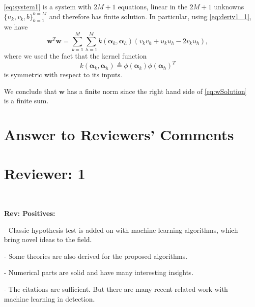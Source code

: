 \documentclass[draftcls,onecolumn,12pt]{IEEEtran}
\newcommand{\wrt}{with respect to }
\begin{document}
	\eqref{eq:system1} is a system with $2M + 1$ equations, linear in the $2M + 1$ unknowns $\{u_k,v_k,b\}_{k=1}^{k=M}$ and therefore has finite solution. In particular, using \eqref{eq:deriv1_1}, we have
	\begin{equation}
	\label{eq:wSolution}
	\bm{w}^T\bm{w} =  \sum_{k=1}^{M} \sum_{h=1}^{M} k(\bm{\alpha}_k,\bm{\alpha}_h) (v_kv_h + u_ku_h -2 v_ku_h),
	\end{equation}
	where we used the fact that the kernel function
	\begin{equation}
	k(\bm{\alpha}_k,\bm{\alpha}_h) \triangleq \phi(\bm{\alpha}_k) \phi(\bm{\alpha}_h)^T
	\end{equation}
	 is symmetric \wrt its inputs. 
	
	
	We conclude that $\bm{w}$ has a finite norm since the right hand side of \eqref{eq:wSolution} is a finite sum.
	  


%
%
\renewcommand*{\bibfont}{\footnotesize}

\printbibliography

\clearpage
\section*{Answer to Reviewers' Comments}
\section*{Reviewer: 1}

~


\begin{framed}
 {\bf Rev: Positives:

- Classic hypothesis test is added on with machine learning algorithms, which bring novel ideas to the field.

- Some theories are also derived for the proposed algorithms.

- Numerical parts are solid and have many interesting insights. 

- The citations are sufficient. But there are many recent related work with machine learning in detection.
}
\end{framed}
\end{document}
